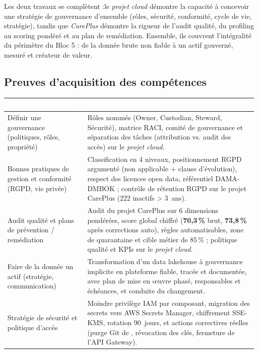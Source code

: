 \documentclass[11pt]{article}
\newcommand{\thead}[1]{\textbf{\textcolor{white}{#1}}}
\newcommand{\code}[1]{\texttt{\seqsplit{#1}}}
\begin{document}
Les deux travaux se complètent :le \textit{projet cloud} démontre la capacité à
concevoir une stratégie de gouvernance d'ensemble (rôles, sécurité, conformité,
cycle de vie, stratégie), tandis que \textit{CarePlus} démontre la rigueur de
l'audit qualité, du profiling au scoring pondéré et au plan de remédiation. Ensemble,
ils couvrent l'intégralité du périmètre du Bloc 5 : de la donnée brute non fiable à
un actif gouverné, mesuré et créateur de valeur.

\subsection{Preuves d'acquisition des compétences}

\begin{center}
\begin{tabularx}{\linewidth}{@{}>{\raggedright\arraybackslash}p{4.2cm}>{\raggedright\arraybackslash}X@{}}
\toprule
\rowcolor{tableHeader}
\thead{Compétence visée} & \thead{Réalisation et preuve} \\
\midrule
Définir une gouvernance (politiques, rôles, propriété) &
  Rôles nommés (Owner, Custodian, Steward, Sécurité), matrice RACI, comité de
  gouvernance et séparation des tâches (attribution vs. audit des accès) sur le 
  \textit{projet cloud}. \\
Bonnes pratiques de gestion et conformité (RGPD, vie privée) &
  Classification en 4 niveaux, positionnement RGPD argumenté (non applicable +
  clause d'évolution), respect des licences open data, référentiel DAMA-DMBOK ;
  contrôle de rétention RGPD sur le projet CarePlus (222 inactifs > 3~ans). \\
Audit qualité et plans de prévention / remédiation &
  Audit  du projet CarePlus sur 6 dimensions pondérées, score global chiffré (\textbf{70,3\,\%}
  brut, \textbf{73,8\,\%} après corrections auto), règles automatisables, zone de
  quarantaine et cible métier de 85\,\% ; politique qualité et KPIs sur le
  \textit{projet cloud}. \\
Faire de la donnée un actif (stratégie, communication) &
  Transformation d'un data lakehouse à gouvernance implicite en plateforme fiable,
  tracée et documentée, avec plan de mise en œuvre phasé, responsables et échéances,
  et conduite du changement. \\
Stratégie de sécurité et politique d'accès &
  Moindre privilège IAM par composant, migration des secrets vers AWS Secrets
  Manager, chiffrement SSE-KMS, rotation 90~jours, et actions correctives réelles
  (purge Git de \code{secrets.toml}, révocation des clés, fermeture de l'API Gateway). \\
\bottomrule
\end{tabularx}
\end{center}
\end{document}
